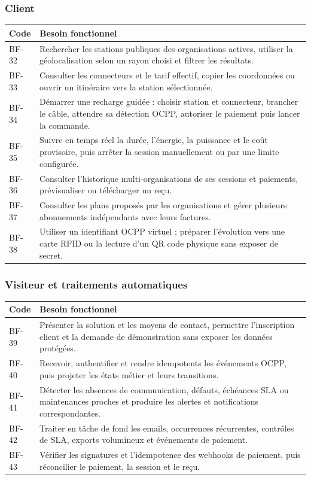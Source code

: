 \subsubsection{Client}

\begin{longtable}{|C{1.35cm}|p{12.3cm}|}
  \hline
  \textbf{Code} & \textbf{Besoin fonctionnel}\\
  \hline
  BF-32 & Rechercher les stations publiques des organisations actives, utiliser la
  géolocalisation selon un rayon choisi et filtrer les résultats.\\\hline
  BF-33 & Consulter les connecteurs et le tarif effectif, copier les coordonnées ou
  ouvrir un itinéraire vers la station sélectionnée.\\\hline
  BF-34 & Démarrer une recharge guidée : choisir station et connecteur, brancher le
  câble, attendre sa détection OCPP, autoriser le paiement puis lancer la commande.\\\hline
  BF-35 & Suivre en temps réel la durée, l'énergie, la puissance et le coût provisoire,
  puis arrêter la session manuellement ou par une limite configurée.\\\hline
  BF-36 & Consulter l'historique multi-organisations de ses sessions et paiements,
  prévisualiser ou télécharger un reçu.\\\hline
  BF-37 & Consulter les plans proposés par les organisations et gérer plusieurs
  abonnements indépendants avec leurs factures.\\\hline
  BF-38 & Utiliser un identifiant OCPP virtuel ; préparer l'évolution vers une carte
  RFID ou la lecture d'un QR code physique sans exposer de secret.\\
  \hline
\end{longtable}

\subsubsection{Visiteur et traitements automatiques}

\begin{longtable}{|C{1.35cm}|p{12.3cm}|}
  \hline
  \textbf{Code} & \textbf{Besoin fonctionnel}\\
  \hline
  BF-39 & Présenter la solution et les moyens de contact, permettre l'inscription
  client et la demande de démonstration sans exposer les données protégées.\\\hline
  BF-40 & Recevoir, authentifier et rendre idempotents les événements OCPP, puis
  projeter les états métier et leurs transitions.\\\hline
  BF-41 & Détecter les absences de communication, défauts, échéances SLA ou
  maintenances proches et produire les alertes et notifications correspondantes.\\\hline
  BF-42 & Traiter en tâche de fond les emails, occurrences récurrentes, contrôles de
  SLA, exports volumineux et événements de paiement.\\\hline
  BF-43 & Vérifier les signatures et l'idempotence des webhooks de paiement, puis
  réconcilier le paiement, la session et le reçu.\\
  \hline
\end{longtable}

